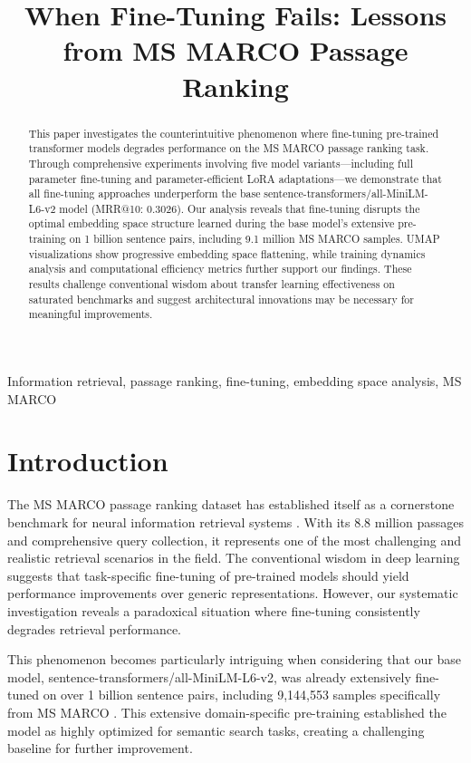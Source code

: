 \documentclass[conference]{IEEEtran}
\title{When Fine-Tuning Fails: Lessons from MS MARCO Passage Ranking}
\author{\IEEEauthorblockN{Manu Pande}
\IEEEauthorblockA{IIIT Allahabad\\
Email: manupande21@gmail.com}}
\begin{document}
\maketitle

\begin{abstract}
This paper investigates the counterintuitive phenomenon where fine-tuning pre-trained transformer models degrades performance on the MS MARCO passage ranking task. Through comprehensive experiments involving five model variants—including full parameter fine-tuning and parameter-efficient LoRA adaptations—we demonstrate that all fine-tuning approaches underperform the base sentence-transformers/all-MiniLM-L6-v2 model (MRR@10: 0.3026). Our analysis reveals that fine-tuning disrupts the optimal embedding space structure learned during the base model's extensive pre-training on 1 billion sentence pairs, including 9.1 million MS MARCO samples. UMAP visualizations show progressive embedding space flattening, while training dynamics analysis and computational efficiency metrics further support our findings. These results challenge conventional wisdom about transfer learning effectiveness on saturated benchmarks and suggest architectural innovations may be necessary for meaningful improvements.
\end{abstract}

\begin{IEEEkeywords}
Information retrieval, passage ranking, fine-tuning, embedding space analysis, MS MARCO
\end{IEEEkeywords}

\section{Introduction}
The MS MARCO passage ranking dataset has established itself as a cornerstone benchmark for neural information retrieval systems \cite{msmarco}. With its 8.8 million passages and comprehensive query collection, it represents one of the most challenging and realistic retrieval scenarios in the field. The conventional wisdom in deep learning suggests that task-specific fine-tuning of pre-trained models should yield performance improvements over generic representations. However, our systematic investigation reveals a paradoxical situation where fine-tuning consistently degrades retrieval performance.

This phenomenon becomes particularly intriguing when considering that our base model, sentence-transformers/all-MiniLM-L6-v2, was already extensively fine-tuned on over 1 billion sentence pairs, including 9,144,553 samples specifically from MS MARCO \cite{huggingface_minilm}. This extensive domain-specific pre-training established the model as highly optimized for semantic search tasks, creating a challenging baseline for further improvement.
\end{document}
